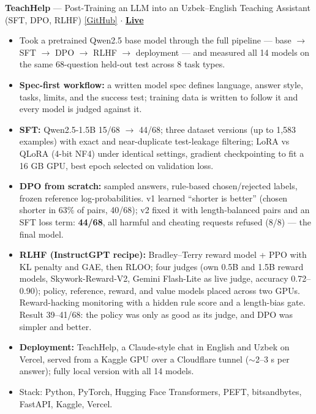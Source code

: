 \documentclass[11pt,a4paper]{article}
\begin{document}
\textbf{TeachHelp} --- Post-Training an LLM into an Uzbek--English Teaching Assistant (SFT, DPO, RLHF) \hfill \href{https://github.com/davronbek-malikov/Post_Training}{[GitHub]} $\cdot$ {\large\textbf{\href{https://teach-help.vercel.app}{Live}}}
\begin{itemize}
    \item Took a pretrained Qwen2.5 base model through the full pipeline --- base $\rightarrow$ SFT $\rightarrow$ DPO
$\rightarrow$ RLHF $\rightarrow$ deployment --- and measured all 14 models on the same 68-question held-out test across 8 task types.
    \item \textbf{Spec-first workflow:} a written model spec defines language, answer style, tasks, limits, and the
success test; training data is written to follow it and every model is judged against it.
    \item \textbf{SFT:} Qwen2.5-1.5B 15/68 $\rightarrow$ 44/68; three dataset versions (up to 1,583 examples) with exact and
near-duplicate test-leakage filtering; LoRA vs QLoRA (4-bit NF4) under identical settings, gradient checkpointing to fit
a 16 GB GPU, best epoch selected on validation loss.
    \item \textbf{DPO from scratch:} sampled answers, rule-based chosen/rejected labels, frozen reference log-probabilities.
v1 learned ``shorter is better'' (chosen shorter in 63\% of pairs, 40/68); v2 fixed it with length-balanced pairs and an
SFT loss term: \textbf{44/68}, all harmful and cheating requests refused (8/8) --- the final model.
    \item \textbf{RLHF (InstructGPT recipe):} Bradley--Terry reward model + PPO with KL penalty and GAE, then RLOO; four judges
(own 0.5B and 1.5B reward models, Skywork-Reward-V2, Gemini Flash-Lite as live judge, accuracy 0.72--0.90); policy,
reference, reward, and value models placed across two GPUs. Reward-hacking monitoring with a hidden rule score and a
length-bias gate. Result 39--41/68: the policy was only as good as its judge, and DPO was simpler and better.
    \item \textbf{Deployment:} TeachHelp, a Claude-style chat in English and Uzbek on Vercel, served from a Kaggle GPU over
a Cloudflare tunnel ($\sim$2--3 s per answer); fully local version with all 14 models.
    \item Stack: Python, PyTorch, Hugging Face Transformers, PEFT, bitsandbytes, FastAPI, Kaggle, Vercel.
\end{itemize}

\medskip
\end{document}
